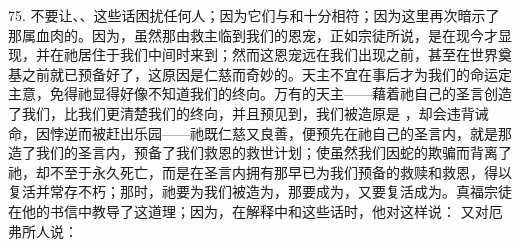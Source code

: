 75. 不要让、、这些话困扰任何人；因为它们与和十分相符；因为这里再次暗示了那属血肉的。因为，虽然那由救主临到我们的恩宠，正如宗徒所说，是在现今才显现，并在祂居住于我们中间时来到；然而这恩宠远在我们出现之前，甚至在世界奠基之前就已预备好了，这原因是仁慈而奇妙的。天主不宜在事后才为我们的命运定主意，免得祂显得好像不知道我们的终向。万有的天主——藉着祂自己的圣言创造了我们，比我们更清楚我们的终向，并且预见到，我们被造原是 ，却会违背诫命，因悖逆而被赶出乐园——祂既仁慈又良善，便预先在祂自己的圣言内，就是那造了我们的圣言内，预备了我们救恩的救世计划；使虽然我们因蛇的欺骗而背离了祂，却不至于永久死亡，而是在圣言内拥有那早已为我们预备的救赎和救恩，得以复活并常存不朽；那时，祂要为我们被造为，那要成为，又要复活成为。真福宗徒在他的书信中教导了这道理；因为，在解释中和这些话时，他对这样说： 又对厄弗所人说：\par

